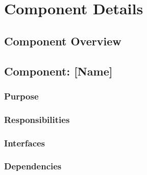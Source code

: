 \section{Component Details}


\subsection{Component Overview}


\subsection{Component: [Name]}

\subsubsection{Purpose}

\subsubsection{Responsibilities}

\subsubsection{Interfaces}

\subsubsection{Dependencies}

